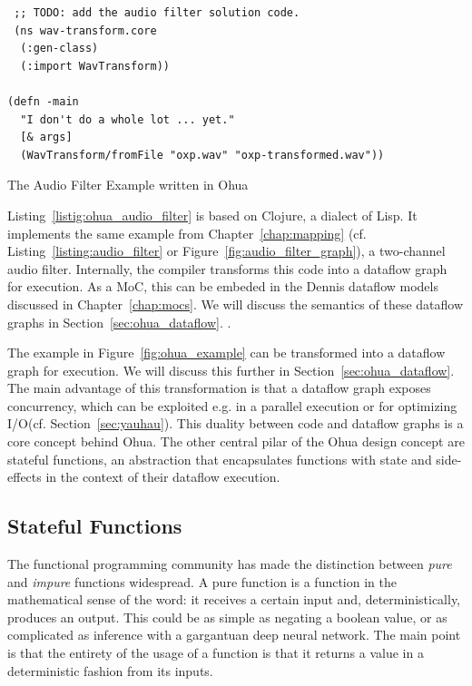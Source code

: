 \begin{listing}
\begin{verbatim}
 ;; TODO: add the audio filter solution code.
 (ns wav-transform.core
  (:gen-class)
  (:import WavTransform))

(defn -main
  "I don't do a whole lot ... yet."
  [& args]
  (WavTransform/fromFile "oxp.wav" "oxp-transformed.wav")) 
\end{verbatim}
\caption{The Audio Filter Example written in Ohua}
\label{listing:ohua_audio_filter}
\end{listing}

Listing~\ref{listig:ohua_audio_filter} is based on Clojure, a dialect of Lisp.
It implements the same example from Chapter~\ref{chap:mapping} (cf. Listing~\ref{listing:audio_filter} or Figure~\ref{fig:audio_filter_graph}), a two-channel audio filter.
Internally, the compiler transforms this code into a dataflow graph for execution.
As a \ac{MoC}, this can be embeded in the Dennis dataflow models discussed in Chapter~\ref{chap:mocs}.
We will discuss the semantics of these dataflow graphs in Section~\ref{sec:ohua_dataflow}.
.

The example in Figure~\ref{fig:ohua_example} can be transformed into a dataflow graph for execution. We will discuss this further in Section~\ref{sec:ohua_dataflow}.
The main advantage of this transformation is that a dataflow graph exposes concurrency, which can be exploited e.g. in a parallel execution or for optimizing \ac{I/O}(cf. Section~\ref{sec:yauhau}).
This duality between code and dataflow graphs is a core concept behind Ohua.
The other central pilar of the Ohua design concept are stateful functions, an abstraction that encapsulates functions with state and side-effects in the context of their dataflow execution.

\subsection{Stateful Functions}
The functional programming community has made the distinction between \emph{pure} and \emph{impure} functions widespread.
A pure function is a function in the mathematical sense of the word: it receives a certain input and, deterministically, produces an output.
This could be as simple as negating a boolean value, or as complicated as inference with a gargantuan deep neural network.
The main point is that the entirety of the usage of a function is that it returns a value in a deterministic fashion from its inputs.

